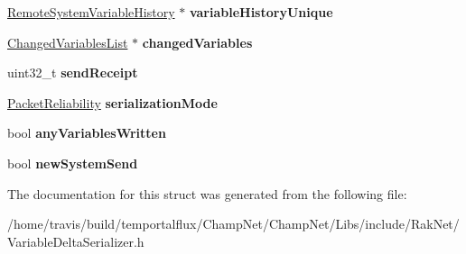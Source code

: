 \begin{DoxyCompactItemize}
\item 
\hypertarget{struct_rak_net_1_1_variable_delta_serializer_1_1_serialization_context_a40424ac06d54a4ee91c88f49fbb933aa}{\hyperlink{struct_rak_net_1_1_variable_delta_serializer_1_1_remote_system_variable_history}{Remote\-System\-Variable\-History} $\ast$ {\bfseries variable\-History\-Unique}}\label{struct_rak_net_1_1_variable_delta_serializer_1_1_serialization_context_a40424ac06d54a4ee91c88f49fbb933aa}

\item 
\hypertarget{struct_rak_net_1_1_variable_delta_serializer_1_1_serialization_context_af5795068bb43f290e2f5eb0ff7eae13f}{\hyperlink{struct_rak_net_1_1_variable_delta_serializer_1_1_changed_variables_list}{Changed\-Variables\-List} $\ast$ {\bfseries changed\-Variables}}\label{struct_rak_net_1_1_variable_delta_serializer_1_1_serialization_context_af5795068bb43f290e2f5eb0ff7eae13f}

\item 
\hypertarget{struct_rak_net_1_1_variable_delta_serializer_1_1_serialization_context_a784f8fc06311ff3a8ea4f1589ededae4}{uint32\-\_\-t {\bfseries send\-Receipt}}\label{struct_rak_net_1_1_variable_delta_serializer_1_1_serialization_context_a784f8fc06311ff3a8ea4f1589ededae4}

\item 
\hypertarget{struct_rak_net_1_1_variable_delta_serializer_1_1_serialization_context_abfa43d1074cc41490105212ce8ef4dd4}{\hyperlink{_packet_priority_8h_ae41fa01235e99dced384d137fa874a7e}{Packet\-Reliability} {\bfseries serialization\-Mode}}\label{struct_rak_net_1_1_variable_delta_serializer_1_1_serialization_context_abfa43d1074cc41490105212ce8ef4dd4}

\item 
\hypertarget{struct_rak_net_1_1_variable_delta_serializer_1_1_serialization_context_a80f91f9077a1c0886306db657e72c83f}{bool {\bfseries any\-Variables\-Written}}\label{struct_rak_net_1_1_variable_delta_serializer_1_1_serialization_context_a80f91f9077a1c0886306db657e72c83f}

\item 
\hypertarget{struct_rak_net_1_1_variable_delta_serializer_1_1_serialization_context_a1181bb907d1cc5b89d2b5665722ee475}{bool {\bfseries new\-System\-Send}}\label{struct_rak_net_1_1_variable_delta_serializer_1_1_serialization_context_a1181bb907d1cc5b89d2b5665722ee475}

\end{DoxyCompactItemize}


The documentation for this struct was generated from the following file\-:\begin{DoxyCompactItemize}
\item 
/home/travis/build/temportalflux/\-Champ\-Net/\-Champ\-Net/\-Libs/include/\-Rak\-Net/Variable\-Delta\-Serializer.\-h\end{DoxyCompactItemize}
